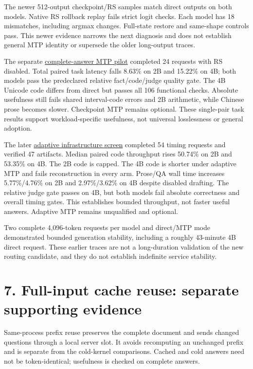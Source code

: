 \documentclass[10pt,a4paper]{article}
\begin{document}
The newer 512-output checkpoint/RS samples match direct outputs on both
models. Native RS rollback replay fails strict logit checks. Each model
has 18 mismatches, including argmax changes. Full-state restore and
same-shape controls pass. This newer evidence narrows the next diagnosis
and does not establish general MTP identity or supersede the older
long-output traces.

The separate
\href{https://github.com/MoyaMryia/riscv-accl/blob/main/spacemit/reports/2026-10-03-mtp-usefulness-results.md}{complete-answer
MTP pilot} completed 24 requests with RS disabled. Total paired task
latency falls 8.63\% on 2B and 15.22\% on 4B; both models pass the
predeclared relative fact/code/judge quality gate. The 4B Unicode code
differs from direct but passes all 106 functional checks. Absolute
usefulness still fails shared interval-code errors and 2B arithmetic,
while Chinese prose becomes slower. Checkpoint MTP remains optional.
These single-pair task results support workload-specific usefulness, not
universal losslessness or general adoption.

The later
\href{https://github.com/MoyaMryia/riscv-accl/blob/main/spacemit/reports/2026-10-05-adaptive-mtp-results.md}{adaptive
infrastructure screen} completed 54 timing requests and verified 47
artifacts. Median paired code throughput rises 50.74\% on 2B and 53.35\%
on 4B. The 2B code is capped. The 4B code is shorter under adaptive MTP
and fails reconstruction in every arm. Prose/QA wall time increases
5.77\%/4.76\% on 2B and 2.97\%/3.62\% on 4B despite disabled drafting.
The relative judge gate passes on 4B, but both models fail absolute
correctness and overall timing gates. This establishes bounded
throughput, not faster useful answers. Adaptive MTP remains unqualified
and optional.

Two complete 4,096-token requests per model and direct/MTP mode
demonstrated bounded generation stability, including a roughly 43-minute
4B direct request. These earlier traces are not a long-duration
validation of the new routing candidate, and they do not establish
indefinite service stability.

\hypertarget{full-input-cache-reuse-separate-supporting-evidence}{%
\section{7. Full-input cache reuse: separate supporting
evidence}\label{full-input-cache-reuse-separate-supporting-evidence}}

Same-process prefix reuse preserves the complete document and sends
changed questions through a local server slot. It avoids recomputing an
unchanged prefix and is separate from the cold-kernel comparisons.
Cached and cold answers need not be token-identical; usefulness is
checked on complete answers.
\end{document}
